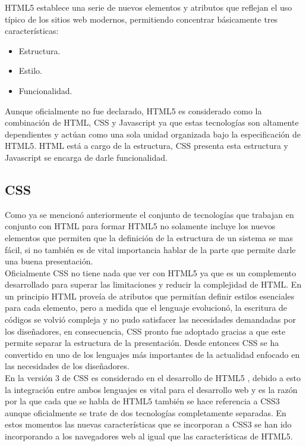 HTML5 establece una serie de nuevos elementos y atributos que reflejan el uso t\'ipico de los sitios web modernos, permitiendo concentrar b\'asicamente tres caracter\'isticas:

\begin{itemize}
	\item Estructura.
	\item Estilo.
	\item Funcionalidad.
\end{itemize}

Aunque oficialmente no fue declarado, HTML5 es considerado como la combinaci\'on de HTML, CSS y Javascript ya que estas tecnolog\'ias son altamente dependientes y act\'uan como una sola unidad organizada bajo  la especificaci\'on de HTML5. HTML est\'a a cargo de la estructura, CSS presenta esta estructura y Javascript se encarga de darle funcionalidad.

\subsection{CSS}

Como ya se mencion\'o anteriormente el conjunto de tecnolog\'ias que trabajan en conjunto con HTML para formar HTML5 no solamente incluye los nuevos elementos que permiten que la definici\'on de la estructura de un sistema se mas f\'acil, si no tambi\'en es de vital importancia hablar de la parte que permite darle una buena presentaci\'on.\\

Oficialmente CSS no tiene nada que ver con HTML5 ya que es un complemento desarrollado para superar las limitaciones y reducir la complejidad de HTML. En un principio HTML prove\'ia de atributos que permit\'ian definir estilos esenciales para cada elemento, pero a medida que el lenguaje evolucion\'o, la escritura de c\'odigos se volvi\'o compleja  y no pudo satisfacer las necesidades demandadas por los dise\~nadores, en consecuencia, CSS pronto fue adoptado gracias a que este permite separar la estructura de la presentaci\'on. Desde entonces CSS se ha convertido en uno de los lenguajes m\'as importantes de la actualidad enfocado en las necesidades de los dise\~nadores.\\

En la versi\'on 3 de CSS es considerado en el desarrollo de HTML5 , debido a esto la integraci\'on entre ambos lenguajes es vital para el desarrollo web  y es la raz\'on por la que cada que se habla de HTML5 tambi\'en se hace referencia a CSS3 aunque oficialmente se trate de dos tecnolog\'ias completamente separadas.
En estos momentos las nuevas caracter\'isticas que se incorporan a CSS3 se han ido incorporando a los navegadores web al igual que las caracter\'isticas de HTML5.

